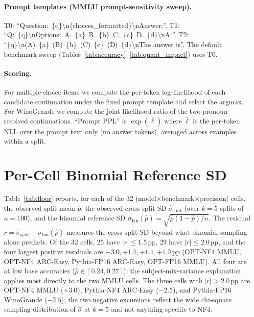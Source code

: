 \documentclass{article}
\begin{document}
\paragraph{Prompt templates (MMLU prompt-sensitivity sweep).}
T0: ``Question:~\{q\}\textbackslash n\{choices\_formatted\}\textbackslash nAnswer:''. T1: ``Q:~\{q\}\textbackslash nOptions:~A.~\{a\}~B.~\{b\}~C.~\{c\}~D.~\{d\}\textbackslash nA:''. T2: ``\{q\}\textbackslash n(A)~\{a\}~(B)~\{b\}~(C)~\{c\}~(D)~\{d\}\textbackslash nThe answer is''. The default benchmark sweep (Tables~\ref{tab:accuracy}--\ref{tab:quant_impact}) uses T0.

\paragraph{Scoring.}
For multiple-choice items we compute the per-token log-likelihood of each candidate continuation under the fixed prompt template and select the argmax. For WinoGrande we compute the joint likelihood ratio of the two pronoun-resolved continuations. ``Prompt PPL'' is $\exp(\bar\ell)$ where $\bar\ell$ is the per-token NLL over the prompt text only (no answer tokens), averaged across examples within a split.

\section{Per-Cell Binomial Reference SD}
\label{sec:floor}

Table~\ref{tab:floor} reports, for each of the 32 (model$\times$benchmark$\times$precision) cells, the observed split mean $\hat p$, the observed cross-split SD $\hat\sigma_{\text{split}}$ (over $k{=}5$ splits of $n{=}100$), and the binomial reference SD $\sigma_{\text{bin}}(\hat p) = \sqrt{\hat p(1-\hat p)/n}$. The residual $r = \hat\sigma_{\text{split}} - \sigma_{\text{bin}}(\hat p)$ measures the cross-split SD beyond what binomial sampling alone predicts. Of the 32 cells, 25 have $|r|\le 1.5$\,pp, 29 have $|r|\le 2.0$\,pp, and the four largest positive residuals are $+3.0, +1.5, +1.1, +1.0$\,pp (OPT-NF4 MMLU, OPT-NF4 ARC-Easy, Pythia-FP16 ARC-Easy, OPT-FP16 MMLU). All four are at low base accuracies ($\hat p \in [0.24, 0.27]$); the subject-mix-variance explanation applies most directly to the two MMLU cells. The three cells with $|r|>2.0$\,pp are OPT-NF4 MMLU ($+3.0$), Pythia-NF4 ARC-Easy ($-2.5$), and Pythia-FP16 WinoGrande ($-2.5$); the two negative excursions reflect the wide chi-square sampling distribution of $\hat\sigma$ at $k{=}5$ and not anything specific to NF4.
\end{document}
